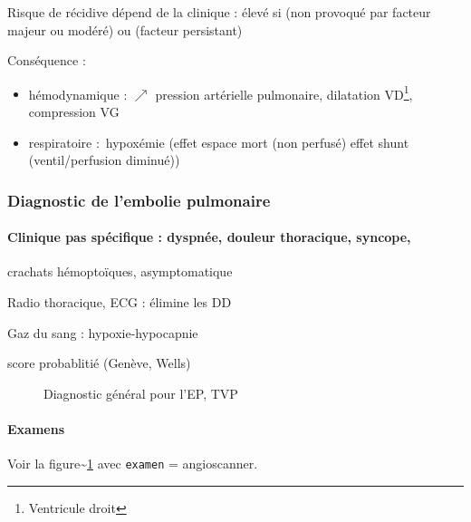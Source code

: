 \documentclass[11pt]{article}
\begin{document}
Risque de récidive dépend de la clinique : élevé si (non provoqué par facteur
majeur ou modéré) ou (\og facteur persistant)

Conséquence :

\begin{itemize}
\item hémodynamique : \(\nearrow\) pression artérielle pulmonaire, dilatation
VD\footnote{Ventricule droit}, compression VG
\item respiratoire : hypoxémie (effet espace mort (non perfusé) \thus effet shunt
(ventil/perfusion diminué))
\end{itemize}


\subsubsection{Diagnostic de l'embolie pulmonaire}
\label{sec:orgc5b0131}

\paragraph{Clinique pas spécifique : dyspnée, douleur thoracique, syncope,}
\label{sec:org0109dfa}
crachats hémoptoïques, asymptomatique

Radio thoracique, ECG : élimine les DD

Gaz du sang : hypoxie-hypocapnie

\thus score probablitié (Genève, Wells)

\begin{figure}[htpb]
  \centering
  \caption{Diagnostic général pour l'EP, TVP}
  \label{fig:ep-diag}
\end{figure}


\paragraph{Examens}
\label{sec:orgfb8ad7c}
Voir la figure\textasciitilde{}\ref{fig:ep-diag} avec \texttt{examen} = angioscanner.
\end{document}
